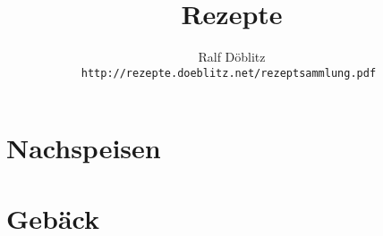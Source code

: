 \documentclass[12pt,a4paper]{report}
\begin{document}
\title{\bfseries\Huge Rezepte}
\author{
  Ralf Döblitz\\[1cm]
  \tt{http://rezepte.doeblitz.net/rezeptsammlung.pdf}
}
\maketitle
\tableofcontents

\chapter{Nachspeisen}


\chapter{Gebäck}






\appendix

\printindex[recipe]

\printindex[ingredient]
\end{document}
